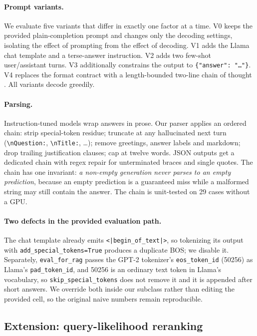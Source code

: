 \documentclass[11pt]{article}
\begin{document}
\paragraph{Prompt variants.} We evaluate five variants that differ in exactly one factor at a
time. \textsc{V0} keeps the provided plain-completion prompt and changes only the decoding
settings, isolating the effect of prompting from the effect of decoding. \textsc{V1} adds the
Llama chat template and a terse-answer instruction. \textsc{V2} adds two few-shot user/assistant
turns. \textsc{V3} additionally constrains the output to \texttt{\{"answer": "\dots"\}}.
\textsc{V4} replaces the format contract with a length-bounded two-line chain of thought
\citep{wei2022cot}. All variants decode greedily.

\paragraph{Parsing.} Instruction-tuned models wrap answers in prose. Our parser applies an
ordered chain: strip special-token residue; truncate at any hallucinated next turn
(\texttt{\textbackslash nQuestion:}, \texttt{\textbackslash nTitle:}, \dots); remove greetings,
answer labels and markdown; drop trailing justification clauses; cap at twelve words. JSON
outputs get a dedicated chain with regex repair for unterminated braces and single quotes. The
chain has one invariant: \emph{a non-empty generation never parses to an empty prediction},
because an empty prediction is a guaranteed miss while a malformed string may still contain
the answer. The chain is unit-tested on 29 cases without a GPU.

\paragraph{Two defects in the provided evaluation path.} The chat template already emits
\texttt{<|begin\_of\_text|>}, so tokenizing its output with \texttt{add\_special\_tokens=True}
produces a duplicate BOS; we disable it. Separately, \texttt{eval\_for\_rag} passes the GPT-2
tokenizer's \texttt{eos\_token\_id} (50256) as Llama's \texttt{pad\_token\_id}, and 50256 is an
ordinary text token in Llama's vocabulary, so \texttt{skip\_special\_tokens} does not remove
it and it is appended after short answers. We override both inside our subclass rather than
editing the provided cell, so the original naive numbers remain reproducible.

\subsection{Extension: query-likelihood reranking}
\end{document}
